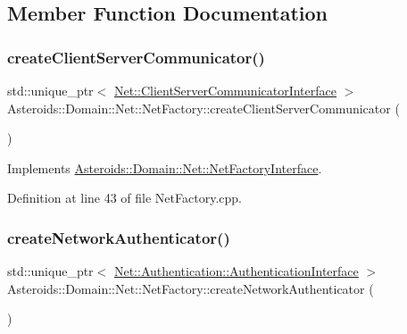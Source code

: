 \subsection{Member Function Documentation}
\mbox{\label{classAsteroids_1_1Domain_1_1Net_1_1NetFactory_ac7ae824eced4da33e4d79e4f219a67e1}} 
\subsubsection{\texorpdfstring{create\+Client\+Server\+Communicator()}{createClientServerCommunicator()}}
{\footnotesize\ttfamily std\+::unique\+\_\+ptr$<$ \hyperlink{classAsteroids_1_1Domain_1_1Net_1_1ClientServerCommunicatorInterface}{Net\+::\+Client\+Server\+Communicator\+Interface} $>$ Asteroids\+::\+Domain\+::\+Net\+::\+Net\+Factory\+::create\+Client\+Server\+Communicator (\begin{DoxyParamCaption}{ }\end{DoxyParamCaption})\hspace{0.3cm}{\ttfamily [virtual]}}



Implements \hyperlink{classAsteroids_1_1Domain_1_1Net_1_1NetFactoryInterface_a821b85ef5a86418acc27bdf337c32b99}{Asteroids\+::\+Domain\+::\+Net\+::\+Net\+Factory\+Interface}.



Definition at line 43 of file Net\+Factory.\+cpp.

\mbox{\label{classAsteroids_1_1Domain_1_1Net_1_1NetFactory_a2fafb49fb45db12d21f45d2753315225}} 
\subsubsection{\texorpdfstring{create\+Network\+Authenticator()}{createNetworkAuthenticator()}}
{\footnotesize\ttfamily std\+::unique\+\_\+ptr$<$ \hyperlink{classAsteroids_1_1Domain_1_1Net_1_1Authentication_1_1AuthenticationInterface}{Net\+::\+Authentication\+::\+Authentication\+Interface} $>$ Asteroids\+::\+Domain\+::\+Net\+::\+Net\+Factory\+::create\+Network\+Authenticator (\begin{DoxyParamCaption}{ }\end{DoxyParamCaption})\hspace{0.3cm}{\ttfamily [virtual]}}



